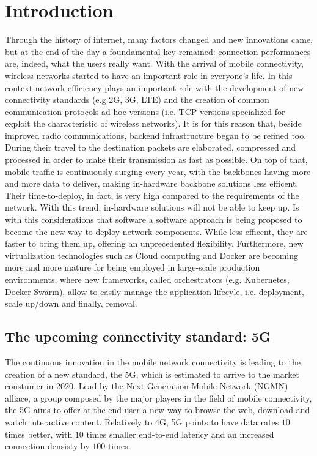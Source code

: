  
\chapter{Introduction}
\label{chap:intro}

 Through the history of internet, many factors changed and new innovations came,
 but at the end of the day a foundamental key remained: connection performances
 are, indeed, what the users really want.
With the arrival of mobile connectivity, wireless networks started to have an 
important role in everyone's life. In this context network efficiency plays 
an important role with the development of new connectivity standards (e.g 2G, 
3G, LTE) and the creation of common communication protocols ad-hoc versions 
(i.e. TCP versions specialized for exploit the characteristic of wireless 
networks). It is for this reason that, beside improved radio communications, 
backend infrastructure began to be refined too. During their travel to the 
destination packets are elaborated, compressed and processed in order to make 
their transmission as fast as possible.
On top of that, mobile traffic is continuously surging every year, with the 
backbones having more and more data to deliver, making in-hardware backbone 
solutions less efficent. Their time-to-deploy, in fact, is very high compared 
to the requirements of the network. With this trend, in-hardware solutions 
will not be able to keep up. Is with this considerations that software a 
software approach is being proposed to become the new way to deploy network 
components. While less efficent, they are faster to bring them up, offering an 
unprecedented flexibility.
 Furthermore, new virtualization technologies such as Cloud computing and Docker
 are becoming more and more mature for being employed in large-scale production
 environments, where new frameworks, called orchestrators (e.g. Kubernetes,
 Docker Swarm), allow to easily manage the application lifecyle, i.e.
 deployment, scale up/down and finally, removal.

\section{The upcoming connectivity standard: 5G}
The continuous innovation in the mobile network connectivity is leading to the
creation of a new standard, the 5G, which is estimated to arrive to the market
constumer in 2020. Lead by the Next Generation Mobile Network (NGMN)
alliace, a group composed by the major players in the field of mobile
connectivity, the 5G aims to offer at the end-user a new way to browse the web,
download and watch interactive content. Relatively to 4G, 5G points to have data
rates $10$ times better, with $10$ times smaller end-to-end latency and an
increased connection densisty by $100$ times.

